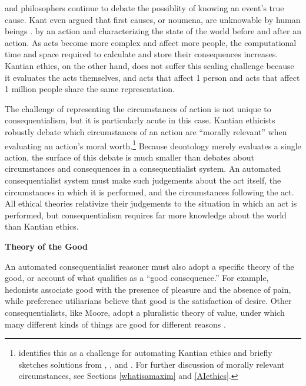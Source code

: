 \begin{isabellebody}
\begin{isamarkuptext}
{and philosophers continue to debate the possiblity of knowing an event's true cause. Kant even argued
that first causes, or noumena, are unknowable by human beings \citep{kantnoumena}.} by an action and
characterizing the state of the world before and after an action. As acts become
more complex and affect more people, the computational time and space required to calculate and store
their consequences increases. Kantian ethics, on the other hand, does not suffer this scaling
challenge because it evaluates the acts themselves, and acts that affect 1 person and acts that 
affect 1 million people share the same representation.

The challenge of representing the circumstances of action is not unique to consequentialism, but it is particularly acute in this case. 
Kantian ethicists robustly debate which circumstances of an action are ``morally relevant'' when evaluating an action's moral worth.\footnote{ 
\citet{powers} identifies this as a challenge for automating Kantian ethics and briefly sketches 
solutions from \citet{constofreason}, \citet{silber}, and \citet{rawlsconstructivism}. For further discussion of
morally relevant circumstances, see Sections \ref{whatisamaxim} and \ref{AIethics}.} Because deontology merely evaluates a 
single action, the surface of this debate is much smaller than debates about circumstances and 
consequences in a consequentialist system. An automated consequentialist system must make such 
judgements about the act itself, the circumstances in which it is performed, and the circumstances 
following the act. All ethical theories relativize their judgements to the situation in which an act 
is performed, but consequentialism requires far more knowledge about the world than Kantian ethics.%
\end{isamarkuptext}\isamarkuptrue%
%
\begin{isamarkuptext}%
\noindent \textbf{Theory of the Good}%
\end{isamarkuptext}\isamarkuptrue%
%
\begin{isamarkuptext}%
An automated consequentialist reasoner must also adopt a specific theory of the good, or account of 
what qualifies as a ``good consequence.'' For example, hedonists associate
good with the presence of pleasure and the absence of pain, while preference utiliarians believe that good is 
the satisfaction of desire. Other consequentialists, like Moore, adopt a pluralistic theory of value, under which 
many different kinds of things are good for different reasons \citep{moorepe}. 


\end{isamarkuptext}
\end{isabellebody}
